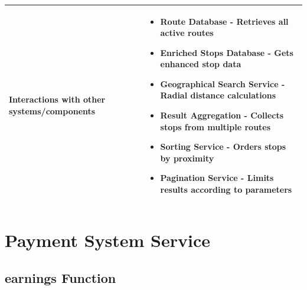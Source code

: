 \documentclass[11pt,a4paper]{article}
\begin{document}
\begin{longtable}{|p{4cm}|p{12cm}|}
\hline
\textbf{Interactions with other systems/components} & 
\begin{itemize}[nosep]
\item Route Database - Retrieves all active routes
\item Enriched Stops Database - Gets enhanced stop data
\item Geographical Search Service - Radial distance calculations
\item Result Aggregation - Collects stops from multiple routes
\item Sorting Service - Orders stops by proximity
\item Pagination Service - Limits results according to parameters
\end{itemize} \\
\hline
\end{longtable}

\section{Payment System Service}

\subsection{earnings Function}
\end{document}
